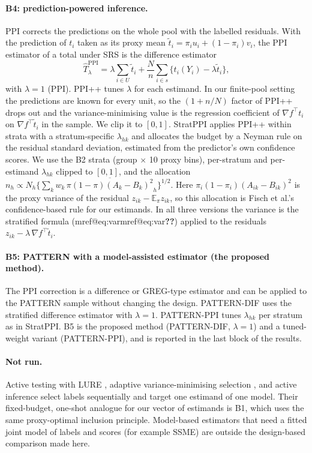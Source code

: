 \documentclass[pdflatex,sn-mathphys-num,iicol]{sn-jnl}
\makeatletter
\theoremstyle{thmstyleone}
\theoremstyle{thmstyletwo}
\theoremstyle{thmstylethree}
\newcommand{\Mref}[1]{\ifcsname mref@#1\endcsname\csname mref@#1\endcsname\else\textbf{??}\fi}
\makeatother
\begin{document}
\paragraph{B4: prediction-powered inference.} PPI \citep{angelopoulos2023ppi} corrects the predictions on the whole pool with the labelled residuals. With the prediction of $t_i$ taken as its proxy mean $\tilde t_i=\pi_iu_i+(1-\pi_i)v_i$, the PPI estimator of a total under SRS is the difference estimator
\[
\hat T^{\mathrm{PPI}}_\lambda=\lambda\sum_{i\in U}\tilde t_i+\frac Nn\sum_{i\in s}\{t_i(Y_i)-\lambda\tilde t_i\},
\]
with $\lambda=1$ (PPI). PPI++ \citep{angelopoulos2026ppipp} tunes $\lambda$ for each estimand. In our finite-pool setting the predictions are known for every unit, so the $(1+n/N)$ factor of PPI++ drops out and the variance-minimising value is the regression coefficient of $\nabla f^\top t_i$ on $\nabla f^\top\tilde t_i$ in the sample. We clip it to $[0,1]$. StratPPI \citep{fisch2024stratppi} applies PPI++ within strata with a stratum-specific $\lambda_{hk}$ and allocates the budget by a Neyman rule on the residual standard deviation, estimated from the predictor's own confidence scores. We use the B2 strata (group $\times$ 10 proxy bins), per-stratum and per-estimand $\lambda_{hk}$ clipped to $[0,1]$, and the allocation $n_h\propto N_h\{\sum_k w_k\,\overline{\pi(1-\pi)(A_{k}-B_{k})^2}_h\}^{1/2}$. Here $\pi_i(1-\pi_i)(A_{ik}-B_{ik})^2$ is the proxy variance of the residual $z_{ik}-\mathbb E_\pi z_{ik}$, so this allocation is Fisch et al.'s confidence-based rule for our estimands. In all three versions the variance is the stratified formula (\Mref{eq:var}) applied to the residuals $z_{ik}-\lambda\,\nabla f^\top\tilde t_i$.

\paragraph{B5: PATTERN with a model-assisted estimator (the proposed method).} The PPI correction is a difference or GREG-type estimator \citep[Chapter~6]{sarndal1992} and can be applied to the PATTERN sample without changing the design. PATTERN-DIF uses the stratified difference estimator with $\lambda=1$. PATTERN-PPI tunes $\lambda_{hk}$ per stratum as in StratPPI. B5 is the proposed method (PATTERN-DIF, $\lambda=1$) and a tuned-weight variant (PATTERN-PPI), and is reported in the last block of the results.

\paragraph{Not run.} Active testing with LURE \citep{kossen2021active}, adaptive variance-minimising selection \citep{hara2024}, and active inference \citep{zrnic2024active,li2025robust} select labels sequentially and target one estimand of one model. Their fixed-budget, one-shot analogue for our vector of estimands is B1, which uses the same proxy-optimal inclusion principle. Model-based estimators that need a fitted joint model of labels and scores (for example SSME) are outside the design-based comparison made here.
\end{document}
